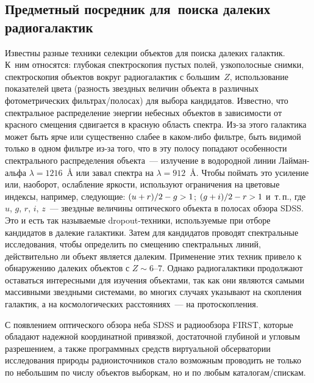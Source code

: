 \begin{multicols}{2}
\subsection{Предметный посредник для~поиска далеких радиогалактик}
 
Известны разные техники селекции объектов для поиска далеких галактик. К~ним относятся: 
глубокая спектроскопия пустых полей, узкополосные снимки, спектроскопия объектов 
вокруг радиогалактик с большим~$Z$, использование показателей цвета (разность звездных 
величин объекта в различных фотометрических фильтрах/полосах) для выбора кандидатов. 
Известно, что спектральное распределение энергии небесных объектов в зависимости от 
красного смещения сдвигается в красную область спектра. Из-за этого галактика может быть 
ярче или существенно слабее в каком-либо фильтре, быть видимой только в одном фильтре 
из-за того, что в эту полосу попадают особенности спектрального распределения объекта~--- 
излучение в водородной линии Лай\-ман-аль\-фа $\lambda=1216$~{\ptb\AA} 
или завал спектра 
на $\lambda=912$~{\ptb\AA}. Чтобы поймать это усиление или, наоборот, ослабление яркости, 
используют ограничения на цветовые индексы, например, следующие: $(u\hm+r)/2-g\hm>1$; 
$(g\hm+i)/2\hm-r \hm>1$ и~т.\,п., где $u$, $g$, $r$, $i$, $z$~--- звездные величины 
оптического объекта в полосах обзора SDSS. Это и есть так называемые 
dropout-тех\-ни\-ки, используемые при отборе кандидатов в далекие галактики. Затем 
для кандидатов проводят спектральные исследования, чтобы определить по смещению 
спектральных линий, действительно ли объект является далеким. Применение этих техник 
привело к обнаружению далеких объектов с $Z\sim6$--7. Однако радиогалактики 
продолжают оставаться интересными для изучения объектами, так как они являются самыми 
массивными звездными системами, во многих случаях указывают на скопления галактик, а 
на космологических расстояниях~--- на протоскопления. 
      
      С появлением оптического обзора неба SDSS и радиообзора FIRST, которые 
обладают надежной координатной привязкой, достаточной глубиной и угловым 
разрешением, а также программных средств виртуальной обсерватории исследования 
природы радиоисточников стало возможным проводить не только по небольшим по числу 
объектов выборкам, но и по любым каталогам/спискам. 
      

\end{multicols}
